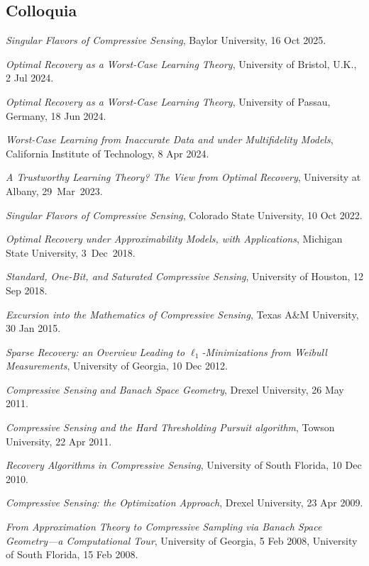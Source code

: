 \documentclass[11pt]{article}
\begin{document}
\subsection{Colloquia}
\bitemize
\item {\sl Singular Flavors of Compressive Sensing}, Baylor University, 16 Oct 2025.
\item {\sl Optimal Recovery as a Worst-Case Learning Theory}, University of Bristol, U.K., 2 Jul 2024.
\item {\sl Optimal Recovery as a Worst-Case Learning Theory}, University of Passau, Germany, 18 Jun 2024.
\item {\sl Worst-Case Learning from Inaccurate Data and under Multifidelity Models},  
California Institute of Technology,  8 Apr 2024.
\item {\sl A Trustworthy Learning Theory? \hspace{-1mm}The View from Optimal Recovery}, University at Albany, 29~Mar~2023.
\item {\sl Singular Flavors of Compressive Sensing}, Colorado State University, 10 Oct 2022.
\item {\sl Optimal Recovery under Approximability Models, with Applications}, Michigan State University, 3~Dec~2018.
\item {\sl Standard, One-Bit, and Saturated Compressive Sensing},
University of Houston, 12 Sep 2018.
\item {\sl Excursion into the Mathematics of Compressive Sensing},
Texas A\&{M} University, 30 Jan 2015.
\item {\sl Sparse Recovery: an Overview Leading to $\ell_1$-Minimizations from Weibull Measurements},
University of Georgia, 10 Dec 2012.
\item {\sl Compressive Sensing and Banach Space Geometry},
Drexel University, 26 May 2011.
\item {\sl Compressive Sensing and the Hard Thresholding Pursuit algorithm},
 Towson University, 22 Apr 2011.
\item {\sl Recovery Algorithms in Compressive Sensing}, University of South Florida, 10 Dec 2010.
\item {\sl Compressive Sensing: the Optimization Approach}, Drexel University, 23 Apr 2009. 
\item {\sl From Approximation Theory to Compressive Sampling via Banach Space Geometry---a Computational Tour},
University of Georgia, 5 Feb 2008,  University of South Florida, 15  Feb 2008.
\eitemize
\end{document}
